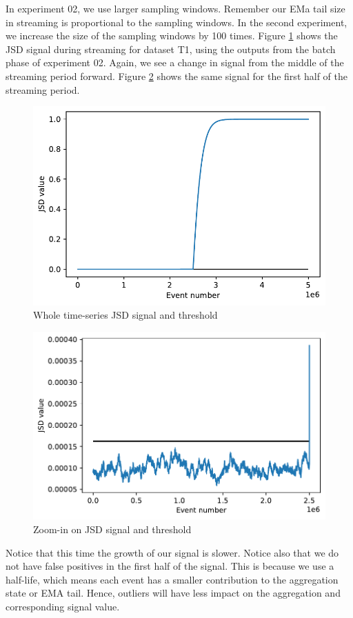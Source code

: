 \documentclass[sigconf]{acmart}
\begin{document}
In experiment 02, we use larger sampling windows. Remember our EMa tail size in streaming is proportional to the sampling windows. In the second experiment, we increase the size of the sampling windows by 100 times. Figure \ref{fig:JSD-signal-02} shows the JSD signal during streaming for dataset T1, using the outputs from the batch phase of experiment 02. Again, we see a change in signal from the middle of the streaming period forward. Figure \ref{fig:JSD-signal-zoom-02} shows the same signal for the first half of the streaming period.
\begin{figure}[!htb]
    \begin{center}
      \includegraphics[scale=0.5]{figures/stream-analysis-viz-62500.pdf}
      \caption{Whole time-series JSD signal and threshold}
      \label{fig:JSD-signal-02}
    \end{center}
\end{figure}
\begin{figure}[!htb]
    \begin{center}
      \includegraphics[scale=0.5]{figures/stream-analysis-viz-zoom-62500.pdf}
      \caption{Zoom-in on JSD signal and threshold}
     \label{fig:JSD-signal-zoom-02}
    \end{center}
\end{figure}
Notice that this time the growth of our signal is slower. Notice also that we do not have false positives in the first half of the signal. This is because we use a half-life, which means each event has a smaller contribution to the aggregation state or EMA tail. Hence, outliers will have less impact on the aggregation and corresponding signal value.
\end{document}
